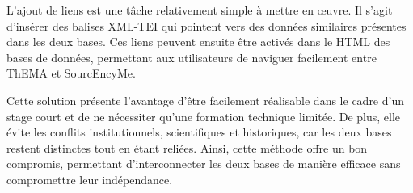 L'ajout de liens est une tâche relativement simple à mettre en œuvre. Il s'agit d'insérer des balises XML-TEI qui pointent vers des données similaires présentes dans les deux bases. Ces liens peuvent ensuite être activés dans le HTML des bases de données, permettant aux utilisateurs de naviguer facilement entre ThEMA et SourcEncyMe.

Cette solution présente l'avantage d'être facilement réalisable dans le cadre d'un stage court et de ne nécessiter qu'une formation technique limitée. De plus, elle évite les conflits institutionnels, scientifiques et historiques, car les deux bases restent distinctes tout en étant reliées. Ainsi, cette méthode offre un bon compromis, permettant d'interconnecter les deux bases de manière efficace sans compromettre leur indépendance.